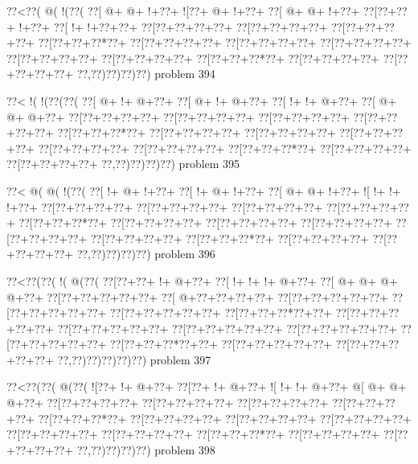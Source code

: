 \vbox{\vbox{\goo
\0??<\0??(\- @(\- !(\0??(
\0??[\- @+\- @+\- !+\0??+
\- ![\0??+\- @+\- !+\0??+
\0??[\- @+\- @+\- !+\0??+
\0??[\0??+\0??+\- !+\0??+
\0??[\- !+\- !+\0??+\0??+
\0??[\0??+\0??+\0??+\0??+
\0??[\0??+\0??+\0??+\0??+
\0??[\0??+\0??+\0??+\0??+
\0??[\0??+\0??+\0??*\0??+
\0??[\0??+\0??+\0??+\0??+
\0??[\0??+\0??+\0??+\0??+
\0??[\0??+\0??+\0??+\0??+
\0??[\0??+\0??+\0??+\0??+
\0??[\0??+\0??+\0??+\0??+
\0??[\0??+\0??+\0??*\0??+
\0??[\0??+\0??+\0??+\0??+
\0??[\0??+\0??+\0??+\0??+
\0??,\0??)\0??)\0??)\0??)
}
\hfil problem 394\hfil\break
}

\vbox{\vbox{\goo
\0??<\- !(\- !(\0??(\0??(
\0??[\- @+\- !+\- @+\0??+
\0??[\- @+\- !+\- @+\0??+
\0??[\- !+\- !+\- @+\0??+
\0??[\- @+\- @+\- @+\0??+
\0??[\0??+\0??+\0??+\0??+
\0??[\0??+\0??+\0??+\0??+
\0??[\0??+\0??+\0??+\0??+
\0??[\0??+\0??+\0??+\0??+
\0??[\0??+\0??+\0??*\0??+
\0??[\0??+\0??+\0??+\0??+
\0??[\0??+\0??+\0??+\0??+
\0??[\0??+\0??+\0??+\0??+
\0??[\0??+\0??+\0??+\0??+
\0??[\0??+\0??+\0??+\0??+
\0??[\0??+\0??+\0??*\0??+
\0??[\0??+\0??+\0??+\0??+
\0??[\0??+\0??+\0??+\0??+
\0??,\0??)\0??)\0??)\0??)
}
\hfil problem 395\hfil\break
}

\vbox{\vbox{\goo
\0??<\- @(\- @(\- !(\0??(
\0??[\- !+\- @+\- !+\0??+
\0??[\- !+\- @+\- !+\0??+
\0??[\- @+\- @+\- !+\0??+
\- ![\- !+\- !+\- !+\0??+
\0??[\0??+\0??+\0??+\0??+
\0??[\0??+\0??+\0??+\0??+
\0??[\0??+\0??+\0??+\0??+
\0??[\0??+\0??+\0??+\0??+
\0??[\0??+\0??+\0??*\0??+
\0??[\0??+\0??+\0??+\0??+
\0??[\0??+\0??+\0??+\0??+
\0??[\0??+\0??+\0??+\0??+
\0??[\0??+\0??+\0??+\0??+
\0??[\0??+\0??+\0??+\0??+
\0??[\0??+\0??+\0??*\0??+
\0??[\0??+\0??+\0??+\0??+
\0??[\0??+\0??+\0??+\0??+
\0??,\0??)\0??)\0??)\0??)
}
\hfil problem 396\hfil\break
}

\vbox{\vbox{\goo
\0??<\0??(\0??(\- !(\- @(\0??(
\0??[\0??+\0??+\- !+\- @+\0??+
\0??[\- !+\- !+\- !+\- @+\0??+
\0??[\- @+\- @+\- @+\- @+\0??+
\0??[\0??+\0??+\0??+\0??+\0??+
\0??[\- @+\0??+\0??+\0??+\0??+
\0??[\0??+\0??+\0??+\0??+\0??+
\0??[\0??+\0??+\0??+\0??+\0??+
\0??[\0??+\0??+\0??+\0??+\0??+
\0??[\0??+\0??+\0??*\0??+\0??+
\0??[\0??+\0??+\0??+\0??+\0??+
\0??[\0??+\0??+\0??+\0??+\0??+
\0??[\0??+\0??+\0??+\0??+\0??+
\0??[\0??+\0??+\0??+\0??+\0??+
\0??[\0??+\0??+\0??+\0??+\0??+
\0??[\0??+\0??+\0??*\0??+\0??+
\0??[\0??+\0??+\0??+\0??+\0??+
\0??[\0??+\0??+\0??+\0??+\0??+
\0??,\0??)\0??)\0??)\0??)\0??)
}
\hfil problem 397\hfil\break
}

\vbox{\vbox{\goo
\0??<\0??(\0??(\- @(\0??(
\- ![\0??+\- !+\- @+\0??+
\0??[\0??+\- !+\- @+\0??+
\- ![\- !+\- !+\- @+\0??+
\- @[\- @+\- @+\- @+\0??+
\0??[\0??+\0??+\0??+\0??+
\0??[\0??+\0??+\0??+\0??+
\0??[\0??+\0??+\0??+\0??+
\0??[\0??+\0??+\0??+\0??+
\0??[\0??+\0??+\0??*\0??+
\0??[\0??+\0??+\0??+\0??+
\0??[\0??+\0??+\0??+\0??+
\0??[\0??+\0??+\0??+\0??+
\0??[\0??+\0??+\0??+\0??+
\0??[\0??+\0??+\0??+\0??+
\0??[\0??+\0??+\0??*\0??+
\0??[\0??+\0??+\0??+\0??+
\0??[\0??+\0??+\0??+\0??+
\0??,\0??)\0??)\0??)\0??)
}
\hfil problem 398\hfil\break
}

